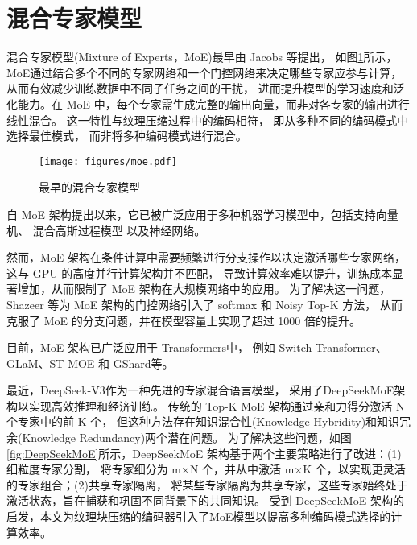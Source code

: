 \section{混合专家模型}

混合专家模型(Mixture of Experts，MoE)最早由 Jacobs 等\cite{jacobs1991adaptive}提出，
如图\ref{fig:MoE}所示，MoE通过结合多个不同的专家网络和一个门控网络来决定哪些专家应参与计算，从而有效减少训练数据中不同子任务之间的干扰，
进而提升模型的学习速度和泛化能力。在 MoE 中，每个专家需生成完整的输出向量，而非对各专家的输出进行线性混合。
这一特性与纹理压缩过程中的编码相符，
即从多种不同的编码模式中选择最佳模式，
而非将多种编码模式进行混合。

\begin{figure}[htbp]
    \centering
    \texttt{[image: figures/moe.pdf]}
    \caption{最早的混合专家模型\cite{jacobs1991adaptive}}
    \label{fig:MoE}
\end{figure}

自 MoE 架构提出以来，它已被广泛应用于多种机器学习模型中，包括支持向量机\cite{collobert2002parallel}、
混合高斯过程模型\cite{tresp2001mixtures,rasmussen2001infinite}
以及神经网络\cite{aljundi2017expert,garmash2016ensemble,eigen2013learning}。

然而，MoE 架构在条件计算中需要频繁进行分支操作以决定激活哪些专家网络，这与 GPU 的高度并行计算架构并不匹配，
导致计算效率难以提升，训练成本显著增加，从而限制了 MoE 架构在大规模网络中的应用。
为了解决这一问题，Shazeer 等\cite{shazeer2017outrageously}为 MoE 架构的门控网络引入了 softmax 和 Noisy Top-K 方法，
从而克服了 MoE 的分支问题，并在模型容量上实现了超过 1000 倍的提升。

目前，MoE 架构已广泛应用于 Transformers\cite{vaswani2017attention}中，
例如 Switch Transformer\cite{fedus2022switch}、
GLaM\cite{du2022glam}、ST-MOE\cite{zoph2022st}
和 GShard\cite{lepikhin2020gshard}等。


最近，DeepSeek-V3\cite{liu2024deepseek}作为一种先进的专家混合语言模型，
采用了DeepSeekMoE架构\cite{dai2024deepseekmoe}以实现高效推理和经济训练。
传统的 Top-K MoE 架构通过亲和力得分激活 N 个专家中的前 K 个，
但这种方法存在知识混合性(Knowledge Hybridity)和知识冗余(Knowledge Redundancy)两个潜在问题。
为了解决这些问题，如图\ref{fig:DeepSeekMoE}所示，DeepSeekMoE 架构基于两个主要策略进行了改进：(1)细粒度专家分割，
将专家细分为 m×N 个，并从中激活 m×K 个，以实现更灵活的专家组合；(2)共享专家隔离，
将某些专家隔离为共享专家，这些专家始终处于激活状态，旨在捕获和巩固不同背景下的共同知识。
受到 DeepSeekMoE 架构的启发，本文为纹理块压缩的编码器引入了MoE模型以提高多种编码模式选择的计算效率。

